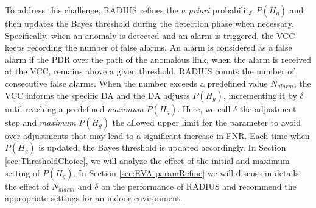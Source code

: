  
To address this challenge, RADIUS refines the \textit{a priori} probability $P(H_g)$ and then updates the Bayes threshold during the detection phase when necessary. Specifically, when an anomaly is detected and an alarm is triggered, the VCC keeps recording the number of false alarms. An alarm is considered as a false alarm if the PDR over the path of the anomalous link, when the alarm is received at the VCC, remains above a given threshold. RADIUS counts the number of consecutive false alarms. When the number exceeds a predefined value $N_{alarm}$, the VCC informs the specific DA and the DA adjusts $P(H_g)$, incrementing it by $\delta$ until reaching a predefined \textit{maximum} $P(H_g)$. Here, we call $\delta$ the adjustment step and \textit{maximum} $P(H_g)$ the allowed upper limit for the parameter to avoid over-adjustments that may lead to a significant increase in FNR. Each time when $P(H_g)$ is updated, the Bayes threshold is updated accordingly. 
%
In Section \ref{sec:ThresholdChoice}, we will analyze the effect of the initial and maximum setting of $P(H_g)$. In Section \ref{sec:EVA-paramRefine} we will discuss in details the effect of $N_{alarm}$ and $\delta$ on the performance of RADIUS and recommend the appropriate settings for an indoor environment.



